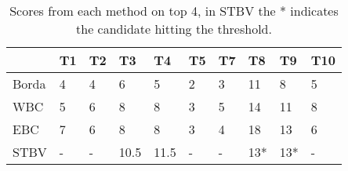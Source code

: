 \begin{table}[H]
	\centering
	\begin{tabular}{l|l|l|l|l|l|l|l|l|l|}
		\cline{2-10}
		& T1 & T2 & T3   & T4   & T5 & T7 & T8  & T9  & T10 \\ \hline
		\multicolumn{1}{|l|}{Borda} & 4  & 4  & 6    & 5    & 2  & 3  & 11  & 8   & 5   \\ \hline
		\multicolumn{1}{|l|}{WBC}   & 5  & 6  & 8    & 8    & 3  & 5  & 14  & 11  & 8   \\ \hline
		\multicolumn{1}{|l|}{EBC}   & 7  & 6  & 8    & 8    & 3  & 4  & 18  & 13  & 6   \\ \hline
		\multicolumn{1}{|l|}{STBV}  & -  & -  & 10.5 & 11.5 & -  & -  & 13* & 13* & -   \\ \hline
	\end{tabular}
	\caption{Scores from each method on top 4, in STBV the * indicates the candidate hitting the threshold.}
	\label{tbl:novelscoresexample}
\end{table}